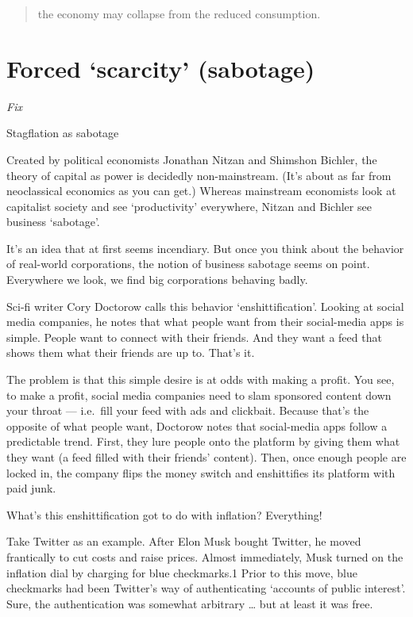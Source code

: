 \documentclass[
]{book}
\begin{document}
\begin{quote}
the economy may collapse from the reduced consumption.
\end{quote}

\hypertarget{forced-scarcity-sabotage}{%
\section{Forced `scarcity' (sabotage)}\label{forced-scarcity-sabotage}}

\emph{Fix}

Stagflation as sabotage

Created by political economists Jonathan Nitzan and Shimshon Bichler, the theory of capital as power is decidedly non-mainstream. (It's about as far from neoclassical economics as you can get.) Whereas mainstream economists look at capitalist society and see `productivity' everywhere, Nitzan and Bichler see business `sabotage'.

It's an idea that at first seems incendiary. But once you think about the behavior of real-world corporations, the notion of business sabotage seems on point. Everywhere we look, we find big corporations behaving badly.

Sci-fi writer Cory Doctorow calls this behavior `enshittification'. Looking at social media companies, he notes that what people want from their social-media apps is simple. People want to connect with their friends. And they want a feed that shows them what their friends are up to. That's it.

The problem is that this simple desire is at odds with making a profit. You see, to make a profit, social media companies need to slam sponsored content down your throat --- i.e.~fill your feed with ads and clickbait. Because that's the opposite of what people want, Doctorow notes that social-media apps follow a predictable trend. First, they lure people onto the platform by giving them what they want (a feed filled with their friends' content). Then, once enough people are locked in, the company flips the money switch and enshittifies its platform with paid junk.

What's this enshittification got to do with inflation? Everything!

Take Twitter as an example. After Elon Musk bought Twitter, he moved frantically to cut costs and raise prices. Almost immediately, Musk turned on the inflation dial by charging for blue checkmarks.1 Prior to this move, blue checkmarks had been Twitter's way of authenticating `accounts of public interest'. Sure, the authentication was somewhat arbitrary \ldots{} but at least it was free.
\end{document}
